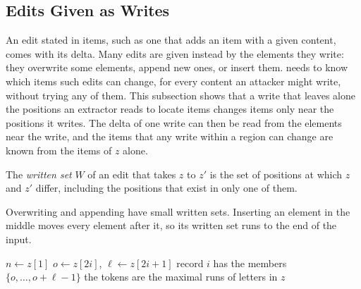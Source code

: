 \subsection{Edits Given as Writes}
\label{sec:fw:edits}

An edit stated in items, such as one that adds an item with a given content, comes with its delta. Many edits are given
instead by the elements they write: they overwrite some elements, append new ones, or insert them.
 needs to know which items such edits can change, for every content an attacker might write,
without trying any of them. This subsection shows that a write that leaves alone the positions an extractor reads to
locate items changes items only near the positions it writes. The delta of one write can then be read from the elements
near the write, and the items that any write within a region can change are known from the items of $z$ alone.

\label{def:fw:written}
{
The \emph{written set} $W$ of an edit that takes $z$ to $z'$ is the set of positions at which $z$ and $z'$ differ,
including the positions that exist in only one of them.
}

\noindent Overwriting and appending have small written sets. Inserting an element in the middle moves every element
after it, so its written set runs to the end of the input.

\begin{algorithm}[t]
  \caption{How the extractor of  finds its records and tokens. A header at the start of $z$
  locates the records, and the tokens are found by scanning.}
  \label{alg:fw:finding}
  \begin{algorithmic}[1]
    \State $n \gets z[1]$ 
      \State $o \gets z[2i]$, $\ell \gets z[2i + 1]$ 
      \State record $i$ has the members $\{o, \dots, o + \ell - 1\}$
    \EndFor
    \State the tokens are the maximal runs of letters in $z$ 
  \end{algorithmic}
\end{algorithm}


